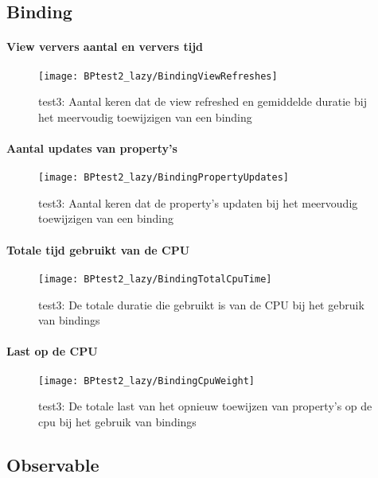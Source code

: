 \subsection{Binding}
\paragraph{View ververs aantal en ververs tijd}
\begin{figure}[H]
    \centering
    \texttt{[image: BPtest2\_lazy/BindingViewRefreshes]} 
    \caption{test3: Aantal keren dat de view refreshed en gemiddelde duratie bij het meervoudig toewijzigen van een binding}
    \label{fig:viewRefreshesBinding2}
\end{figure}
\paragraph{Aantal updates van property's}
\begin{figure}[H]
    \centering
    \texttt{[image: BPtest2\_lazy/BindingPropertyUpdates]} 
    \caption{test3: Aantal keren dat de property's updaten bij het meervoudig toewijzigen van een binding}
    \label{fig:propertyUpdatesBinding2}
\end{figure}
\paragraph{Totale tijd gebruikt van de CPU}
\begin{figure}[H]
    \centering
    \texttt{[image: BPtest2\_lazy/BindingTotalCpuTime]} 
    \caption{test3: De totale duratie die gebruikt is van de CPU bij het gebruik van bindings}
    \label{fig:cpuUsageTimeBinding2}
\end{figure}
\paragraph{Last op de CPU}
\begin{figure}[H]
    \centering
    \texttt{[image: BPtest2\_lazy/BindingCpuWeight]} 
    \caption{test3: De totale last van het opnieuw toewijzen van property's op de cpu bij het gebruik van bindings}
    \label{fig:cpuWeightBinding2}
\end{figure}

\subsection{Observable}
